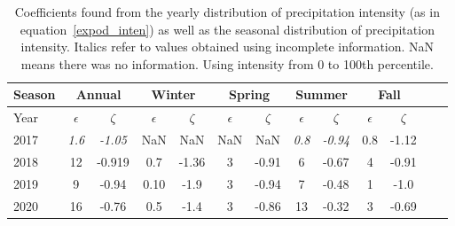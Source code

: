 \begin{table}[htb]
  \begin{center}
    \begin{tabular}{|l|*{11}{c|}r|}
      \hline
      Season    &       \multicolumn{2}{|c|}{Annual}          & \multicolumn{2}{|c|}{Winter}& \multicolumn{2}{|c|}{Spring}  & \multicolumn{2}{|c|}{Summer} &\multicolumn{2}{|c|}{Fall}  \\
      \hline
      Year      & $\epsilon $ & $\zeta$  &  $\epsilon $ & $\zeta$  &  $\epsilon $ & $\zeta$  &  $\epsilon $ & $\zeta$  & $\epsilon $ & $\zeta$ \\
      \hline
      2017      & \textit{1.6}  & \textit{-1.05}  & NaN & NaN & NaN & NaN & \textit{0.8}  & \textit{-0.94}  & 0.8  & -1.12 \\
      2018      & 12           & -0.919  & 0.7 & -1.36 & 3 & -0.91  & 6  & -0.67  & 4 & -0.91  \\
      2019      & 9           & -0.94  & 0.10 & -1.9 & 3 & -0.94 & 7 & -0.48 & 1 & -1.0  \\
      2020      & 16          & -0.76  & 0.5 & -1.4 & 3 & -0.86 & 13  & -0.32 & 3 & -0.69\\
      \hline
    \end{tabular}
  \end{center}
  \caption[Year comparison of coefficients for precipitation
    intensity using 0 to 100 percentile] {\label{fourthtable_100}Coefficients found from the yearly
    distribution of precipitation intensity (as in equation~\ref{expod_inten}) as
    well as the seasonal distribution of precipitation
    intensity. Italics refer to values obtained using incomplete
    information. NaN means there was no information. Using intensity from 0 to 100th percentile. }
\end{table}
